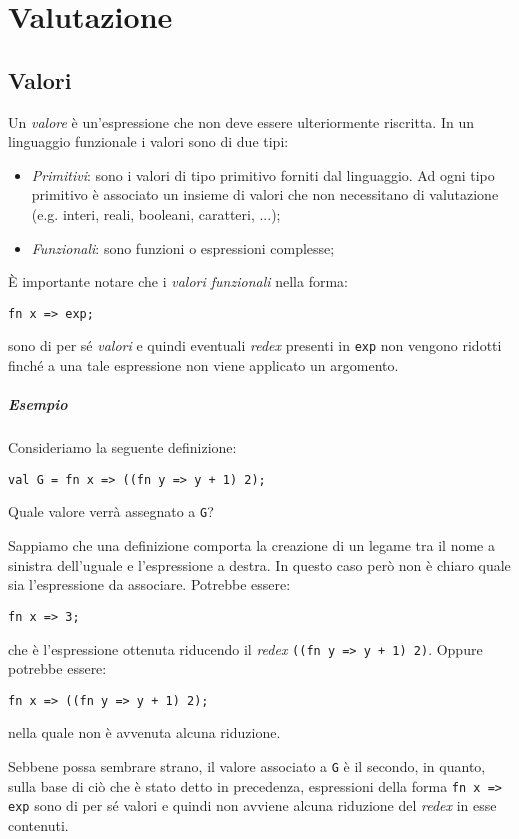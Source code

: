 \documentclass[12pt, a4paper]{report}
\theoremstyle{definition}
\newcommand{\code}[1]{\texttt{#1}}
\begin{document}
\chapter{Valutazione}
\section{Valori}
Un \emph{valore} è un'espressione che non deve essere ulteriormente riscritta.
In un linguaggio funzionale i valori sono di due tipi:
\begin{itemize}
    \item \emph{Primitivi}: sono i valori di tipo primitivo forniti dal
    linguaggio. Ad ogni tipo primitivo è associato un insieme di valori che non
    necessitano di valutazione (e.g. interi, reali, booleani, caratteri, ...);
    \item \emph{Funzionali}: sono funzioni o espressioni complesse;
\end{itemize}
È importante notare che i \emph{valori funzionali} nella forma:
\begin{lstlisting}
fn x => exp;
\end{lstlisting}
sono di per sé \emph{valori} e quindi eventuali \emph{redex} presenti in \code{exp}
non vengono ridotti finché a una tale espressione non viene applicato un argomento.

\paragraph*{Esempio} Consideriamo la seguente definizione:
\begin{lstlisting}
val G = fn x => ((fn y => y + 1) 2);
\end{lstlisting}
Quale valore verrà assegnato a \code{G}?

Sappiamo che una definizione comporta la creazione di un legame tra il nome a
sinistra dell'uguale e l'espressione a destra. In questo caso però non è chiaro
quale sia l'espressione da associare. Potrebbe essere:
\begin{lstlisting}
fn x => 3;
\end{lstlisting}
che è l'espressione ottenuta riducendo il \emph{redex} \code{((fn y => y + 1) 2)}.
Oppure potrebbe essere:
\begin{lstlisting}
fn x => ((fn y => y + 1) 2);
\end{lstlisting}
nella quale non è avvenuta alcuna riduzione.

Sebbene possa sembrare strano, il valore associato a \code{G} è il secondo, in
quanto, sulla base di ciò che è stato detto in precedenza, espressioni della
forma \code{fn x => exp} sono di per sé valori e quindi non avviene alcuna
riduzione del \emph{redex} in esse contenuti.
\end{document}

